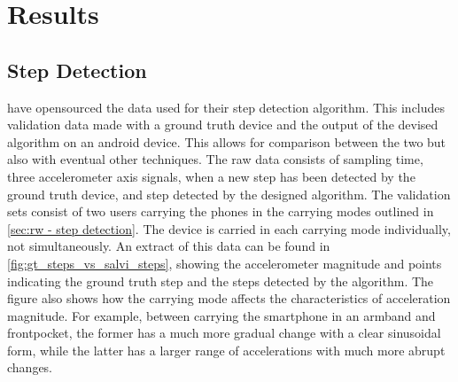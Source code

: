 \chapter{Results}

\section{Step Detection}
\citet{Salvi2018} have opensourced the data used for their step detection algorithm. This includes validation data made with a ground truth device and the output of the devised algorithm on an android device. This allows for comparison between the two but also with eventual other techniques. The raw data consists of sampling time, three accelerometer axis signals, when a new step has been detected by the ground truth device, and step detected by the designed algorithm. The validation sets consist of two users carrying the phones in the carrying modes outlined in \cref{sec:rw - step detection}. The device is carried in each carrying mode individually, not simultaneously. An extract of this data can be found in \cref{fig:gt_steps_vs_salvi_steps}, showing the accelerometer magnitude and points indicating the ground truth step and the steps detected by the \citet{Salvi2018} algorithm. The figure also shows how the carrying mode affects the characteristics of acceleration magnitude. For example, between carrying the smartphone in an armband and frontpocket, the former has a much more gradual change with a clear sinusoidal form, while the latter has a larger range of accelerations with much more abrupt changes.  

